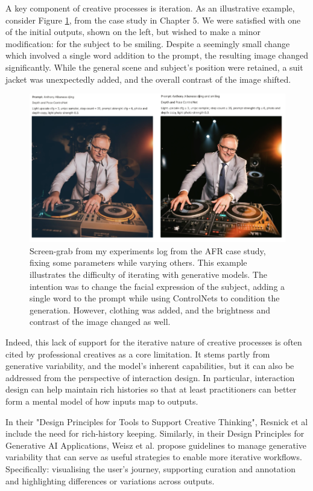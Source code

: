 A key component of creative processes is iteration.  As an illustrative example, consider Figure \ref{fig:albo_series}, from the case study in Chapter 5. We were satisfied with one of the initial outputs, shown on the left, but wished to make a minor modification: for the subject to be smiling. Despite a seemingly small change which involved a single word addition to the prompt, the resulting image changed significantly. While the general scene and subject's position were retained, a suit jacket was unexpectedly added, and the overall contrast of the image shifted. 

\begin{figure}[H]
    \centering
    \includegraphics[width=1\linewidth]{alboexperiments.png}
    \caption{Screen-grab from my experiments log from the AFR case study, fixing some parameters while varying others. This example illustrates the difficulty of iterating with generative models. The intention was to change the facial expression of the subject, adding a single word to the prompt while using ControlNets to condition the generation. However, clothing was added, and the brightness and contrast of the image changed as well.}
    \label{fig:albo_series}
\end{figure}

Indeed, this lack of support for the iterative nature of creative processes is often cited by professional creatives as a core limitation. It stems partly from generative variability, and the model's inherent capabilities, but it can also be addressed from the perspective of interaction design. In particular, interaction design can help maintain rich histories so that at least practitioners can better form a mental model of how inputs map to outputs. 

In their "Design Principles for Tools to Support Creative Thinking", Resnick et al \cite{Resnick2005-fs} include the need for rich-history keeping. Similarly, in their Design Principles for Generative AI Applications, Weisz et al. \cite{Weisz2024-io} propose guidelines to manage generative variability that can serve as useful strategies to enable more iterative workflows. Specifically: visualising the user's journey, supporting curation and annotation and highlighting differences or variations across outputs.


